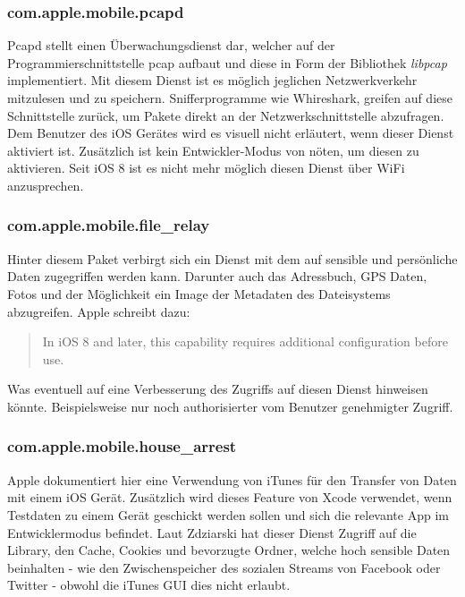 		\subsubsection{com.apple.mobile.pcapd}
			Pcapd stellt einen Überwachungsdienst dar, welcher auf der
			Programmierschnittstelle
			pcap\cite{PCAP2015} aufbaut und
			diese in Form der Bibliothek \textsl{libpcap} implementiert. Mit diesem
			Dienst ist es möglich jeglichen Netzwerkverkehr mitzulesen und zu speichern.
			Snifferprogramme wie Whireshark\cite{WHIRESHARK2015}, greifen auf
			diese Schnittstelle zurück, um Pakete direkt an der Netzwerkschnittstelle
			abzufragen. Dem Benutzer des iOS Gerätes wird es visuell nicht erläutert,
			wenn dieser Dienst aktiviert ist. Zusätzlich ist kein Entwickler-Modus von
			nöten, um diesen zu aktivieren. Seit iOS 8 ist es nicht mehr möglich diesen
			Dienst über WiFi anzusprechen.
		\subsubsection{com.apple.mobile.file\_relay}
			Hinter diesem Paket verbirgt sich ein Dienst mit dem auf sensible und
			persönliche Daten zugegriffen werden kann. Darunter auch das Adressbuch, GPS
			Daten, Fotos und der Möglichkeit ein Image der Metadaten des Dateisystems
			abzugreifen. Apple schreibt dazu:
			\begin{quote}
				In iOS 8 and later, this capability requires additional configuration before
				use.\cite{AppleDiagnosticCap2015}
			\end{quote}
			Was eventuell auf eine Verbesserung des Zugriffs auf diesen Dienst hinweisen
			könnte. Beispielsweise nur noch authorisierter vom Benutzer genehmigter
			Zugriff.
		\subsubsection{com.apple.mobile.house\_arrest}
			Apple dokumentiert hier eine Verwendung von iTunes für den Transfer von Daten
			mit einem iOS Gerät. Zusätzlich wird dieses Feature von Xcode verwendet,
			wenn Testdaten zu einem Gerät geschickt werden sollen und sich die relevante
			App im Entwicklermodus befindet. Laut Zdziarski hat dieser Dienst Zugriff auf
			die Library, den Cache, Cookies und bevorzugte Ordner, welche hoch sensible
			Daten beinhalten - wie den Zwischenspeicher des sozialen Streams von Facebook
			oder Twitter - obwohl die iTunes GUI dies nicht erlaubt.
			
